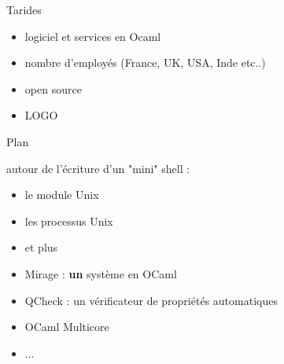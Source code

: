 
\begin{frame}{Tarides}
\wip
    \begin{itemize}[label=$-$]
        \item logiciel et services en Ocaml
        \item  nombre d'employés (France, UK, USA, Inde etc..)
        \item open source  
        \item LOGO
    \end{itemize}
\end{frame}

\begin{frame}{Plan}
\wip

   
    autour de l'écriture d'un "mini" shell :
    \begin{itemize}[label=]
        \item le module Unix
        \item les processus Unix  
        \item et plus 
    \end{itemize}   
    
     \begin{itemize}[label=$-$]
        \item Mirage : \textbf{un} système en OCaml
        \item QCheck : un vérificateur de propriétés automatiques
        \item OCaml Multicore 
        \item ... 
    \end{itemize}   
\end{frame}